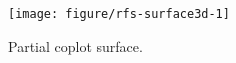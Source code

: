 \documentclass[nojss]{jss}\usepackage[]{graphicx}\usepackage[]{color}
\begin{document}
\begin{Schunk}
\begin{figure}[!htpb]

{\centering \texttt{[image: figure/rfs-surface3d-1]} 

}

\caption[Partial coplot surface]{Partial coplot surface.\label{fig:surface3d}}
\end{figure}
\end{Schunk}
\end{document}
